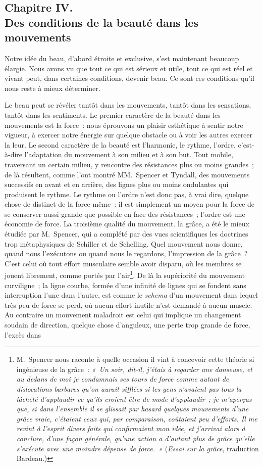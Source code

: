 \documentclass[french,twoside]{book} %
\begin{document}
\subsection[{Chapitre IV. Des conditions de la beauté dans les mouvements}]{Chapitre IV. \\
Des conditions de la beauté dans les mouvements}
\noindent  Notre idée du beau, d’abord étroite et exclusive, s’est maintenant beaucoup élargie. Nous avons vu que tout ce qui est sérieux et utile, tout ce qui est réel et vivant peut, dans certaines conditions, devenir beau. Ce sont ces conditions qu’il nous reste à mieux déterminer.\par
Le beau peut se révéler tantôt dans les mouvements, tantôt dans les sensations, tantôt dans les sentiments. Le premier caractère de la beauté dans les mouvements est la force : nous éprouvons un plaisir esthétique à sentir notre vigueur, à exercer notre énergie sur quelque obstacle ou à voir les autres exercer la leur. Le second caractère de la beauté est l’harmonie, le rythme, l’ordre, c’est-à-dire l’adaptation du mouvement à son milieu et à son but. Tout mobile, traversant un certain milieu, y rencontre des résistances plus ou moins grandes ; de là résultent, comme l’ont montré MM. Spencer et Tyndall, des mouvements successifs en avant et en arrière, des lignes plus ou moins ondulantes qui produisent le rythme. Le rythme ou l’ordre  n’est donc pas, à vrai dire, quelque chose de distinct de la force même : il est simplement un moyen pour la force de se conserver aussi grande que possible en face des résistances ; l’ordre est une économie de force. La troisième qualité du mouvement. la grâce, a été le mieux étudiée par M. Spencer, qui a complété par des vues scientifiques les doctrines trop métaphysiques de Schiller et de Schelling. Quel mouvement nous donne, quand nous l’exécutons ou quand nous le regardons, l’impression de la grâce ? C’est celui où tout effort musculaire semble avoir disparu, où les membres se jouent librement, comme portés par l’air\footnote{M. Spencer nous raconte à quelle occasion il vint à concevoir cette théorie si ingénieuse de la grâce : \emph{« Un soir, dit-il, j’étais à regarder une danseuse, et au dedans de moi je condamnais ses tours de force comme autant de dislocations barbares qu’on aurait sifflées si les gens n’avaient pas tous la lâcheté d’applaudir ce qu’ils croient être de mode d’applaudir ; je m’aperçus que, si dans l’ensemble il se glissait par hasard quelques mouvements d’une grâce vraie, c’étaient ceux qui, par comparaison, coûtaient peu d’efforts. Il me revint à l’esprit divers faits qui confirmaient mon idée, et j’arrivai alors à conclure, d’une façon générale, qu’une action a d’autant plus de grâce qu’elle s’exécute avec une moindre dépense de force. »} (\emph{Essai sur la grâce}, traduction Bardeau.)}. De là la supériorité du mouvement curviligne ; la ligne courbe, formée d’une infinité de lignes qui se fondent sans interruption l’une dans l’autre, est comme le \emph{schema} d’un mouvement dans lequel très peu de force se perd, où aucun effort inutile n’est demandé à aucun muscle. Au contraire un mouvement maladroit est celui qui implique un changement soudain de direction, quelque chose d’anguleux, une perte trop grande de force, l’excès dans 
\end{document}
